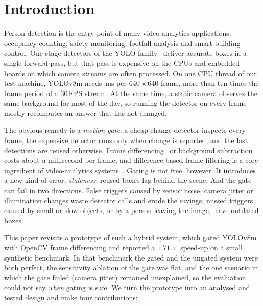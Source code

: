 \section{Introduction}\label{sec:intro}

Person detection is the entry point of many video-analytics applications: occupancy counting, safety monitoring, footfall analysis and smart-building control. One-stage detectors of the YOLO family~\cite{redmon2016yolo,jocher2023yolov8} deliver accurate boxes in a single forward pass, but that pass is expensive on the CPUs and embedded boards on which camera streams are often processed. On one CPU thread of our test machine, YOLOv8m needs \YoloMs\,ms per $640\times640$ frame, more than ten times the frame period of a 30\,FPS stream. At the same time, a static camera observes the same background for most of the day, so running the detector on every frame mostly recomputes an answer that has not changed.

The obvious remedy is a \emph{motion gate}: a cheap change detector inspects every frame, the expensive detector runs only when change is reported, and the last detections are reused otherwise. Frame differencing~\cite{jain1979difference} or background subtraction~\cite{stauffer1999adaptive,zivkovic2004improved} costs about a millisecond per frame, and difference-based frame filtering is a core ingredient of video-analytics systems~\cite{kang2017noscope,li2020reducto,arefeen2022framehopper}. Gating is not free, however. It introduces a new kind of error, \emph{staleness}: reused boxes lag behind the scene. And the gate can fail in two directions. False triggers caused by sensor noise, camera jitter or illumination changes waste detector calls and erode the savings; missed triggers caused by small or slow objects, or by a person leaving the image, leave outdated boxes.

This paper revisits a prototype of such a hybrid system, which gated YOLOv8m with OpenCV frame differencing and reported a $1.71\times$ speed-up on a small synthetic benchmark. In that benchmark the gated and the ungated system were both perfect, the sensitivity ablation of the gate was flat, and the one scenario in which the gate failed (camera jitter) remained unexplained, so the evaluation could not say \emph{when} gating is safe. We turn the prototype into an analysed and tested design and make four contributions:

